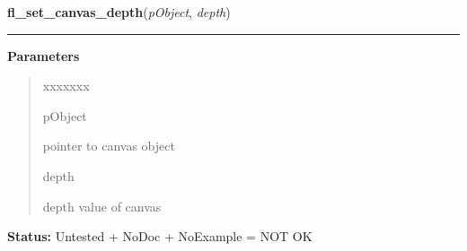     \label{xformslib:library:fl_set_canvas_depth}

    \vspace{0.5ex}

\hspace{.8\funcindent}\begin{boxedminipage}{\funcwidth}

    \raggedright \textbf{fl\_set\_canvas\_depth}(\textit{pObject}, \textit{depth})

    \vspace{-1.5ex}

    \rule{\textwidth}{0.5\fboxrule}
\setlength{\parskip}{2ex}
\setlength{\parskip}{1ex}
      \textbf{Parameters}
      \vspace{-1ex}

      \begin{quote}
        \begin{Ventry}{xxxxxxx}

          \item[pObject]

          pointer to canvas object

          \item[depth]

          depth value of canvas

        \end{Ventry}

      \end{quote}

\textbf{Status:} Untested + NoDoc + NoExample = NOT OK



    \end{boxedminipage}

    \label{xformslib:library:fl_set_canvas_attributes}

    \vspace{0.5ex}

